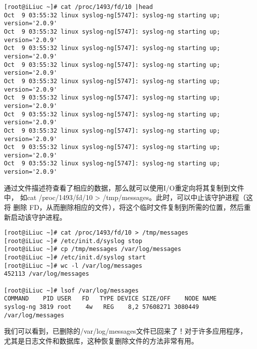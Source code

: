 \begin{verbatim}
[root@iLiuc ~]# cat /proc/1493/fd/10 |head
Oct  9 03:55:32 linux syslog-ng[5747]: syslog-ng starting up; version='2.0.9'
Oct  9 03:55:32 linux syslog-ng[5747]: syslog-ng starting up; version='2.0.9'
Oct  9 03:55:32 linux syslog-ng[5747]: syslog-ng starting up; version='2.0.9'
Oct  9 03:55:32 linux syslog-ng[5747]: syslog-ng starting up; version='2.0.9'
Oct  9 03:55:32 linux syslog-ng[5747]: syslog-ng starting up; version='2.0.9'
Oct  9 03:55:32 linux syslog-ng[5747]: syslog-ng starting up; version='2.0.9'
Oct  9 03:55:32 linux syslog-ng[5747]: syslog-ng starting up; version='2.0.9'
Oct  9 03:55:32 linux syslog-ng[5747]: syslog-ng starting up; version='2.0.9'
Oct  9 03:55:32 linux syslog-ng[5747]: syslog-ng starting up; version='2.0.9'
Oct  9 03:55:32 linux syslog-ng[5747]: syslog-ng starting up; version='2.0.9'
\end{verbatim}

通过文件描述符查看了相应的数据，那么就可以使用I/O重定向将其复制到文件中，
如cat /proc/1493/fd/10 > /tmp/messages。此时，可以中止该守护进程（这将
  删除 FD，从而删除相应的文件），将这个临时文件复制到所需的位置，然后重
新启动该守护进程。

\begin{verbatim}
[root@iLiuc ~]# cat /proc/1493/fd/10 > /tmp/messages
[root@iLiuc ~]# /etc/init.d/syslog stop
[root@iLiuc ~]# cp /tmp/messages /var/log/messages
[root@iLiuc ~]# /etc/init.d/syslog start
[root@iLiuc ~]# wc -l /var/log/messages 
452113 /var/log/messages

[root@iLiuc ~]# lsof /var/log/messages 
COMMAND    PID USER   FD   TYPE DEVICE SIZE/OFF    NODE NAME
syslog-ng 3819 root    4w   REG    8,2 57608271 3080449 /var/log/messages
\end{verbatim}

我们可以看到，已删除的/var/log/messages文件已回来了！对于许多应用程序，
尤其是日志文件和数据库，这种恢复删除文件的方法非常有用。
